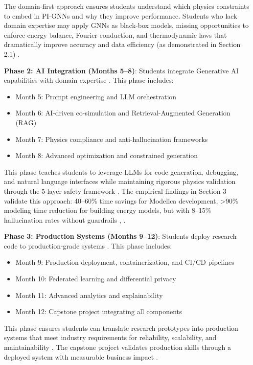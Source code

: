 \documentclass[12pt,a4paper]{article}
\begin{document}
The domain-first approach ensures students understand which physics constraints to embed in PI-GNNs and why they improve performance. Students who lack domain expertise may apply GNNs as black-box models, missing opportunities to enforce energy balance, Fourier conduction, and thermodynamic laws that dramatically improve accuracy and data efficiency (as demonstrated in Section 2.1) \cite{ref238}.

\textbf{Phase 2: AI Integration (Months 5--8)}: Students integrate Generative AI capabilities with domain expertise \cite{ref239}. This phase includes:
\begin{itemize}
  \item Month 5: Prompt engineering and LLM orchestration \cite{ref240}
  \item Month 6: AI-driven co-simulation and Retrieval-Augmented Generation (RAG) \cite{ref241}
  \item Month 7: Physics compliance and anti-hallucination frameworks \cite{ref242}
  \item Month 8: Advanced optimization and constrained generation \cite{ref243}
\end{itemize}

This phase teaches students to leverage LLMs for code generation, debugging, and natural language interfaces while maintaining rigorous physics validation through the 5-layer safety framework \cite{ref244}. The empirical findings in Section 3 validate this approach: 40--60\% time savings for Modelica development, >90\% modeling time reduction for building energy models, but with 8--15\% hallucination rates without guardrails \cite{ref245}, \cite{ref246}.

\textbf{Phase 3: Production Systems (Months 9--12)}: Students deploy research code to production-grade systems \cite{ref247}. This phase includes:
\begin{itemize}
  \item Month 9: Production deployment, containerization, and CI/CD pipelines \cite{ref248}
  \item Month 10: Federated learning and differential privacy \cite{ref249}
  \item Month 11: Advanced analytics and explainability \cite{ref250}
  \item Month 12: Capstone project integrating all components \cite{ref251}
\end{itemize}

This phase ensures students can translate research prototypes into production systems that meet industry requirements for reliability, scalability, and maintainability \cite{ref252}. The capstone project validates production skills through a deployed system with measurable business impact \cite{ref253}.
\end{document}
